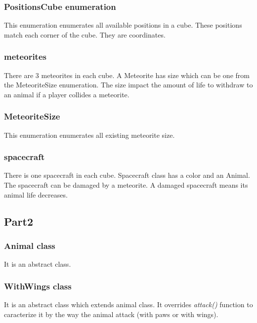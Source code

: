\subsubsection{PositionsCube enumeration}

This enumeration enumerates all available positions in a cube. 
These positions match each corner of the cube.
They are coordinates.

\subsubsection{meteorites}

There are 3 meteorites in each cube. 
A Meteorite has size which can be one from the MeteoriteSize enumeration.
The size impact the amount of life to withdraw to an animal if a player collides a meteorite.

\subsubsection{MeteoriteSize}

This enumeration enumerates all existing meteorite size.

\subsubsection{spacecraft}

There is one spacecraft in each cube.
Spacecraft class has a color and an Animal.
The spacecraft can be damaged by a meteorite.
A damaged spacecraft means its animal life decreases.

\subsection{Part2}

\subsubsection{Animal class}

It is an abstract class.

\subsubsection{WithWings class}

It is an abstract class which extends animal class.
It overrides \textit{attack()} function to caracterize it by the way the animal attack (with paws or with wings).

